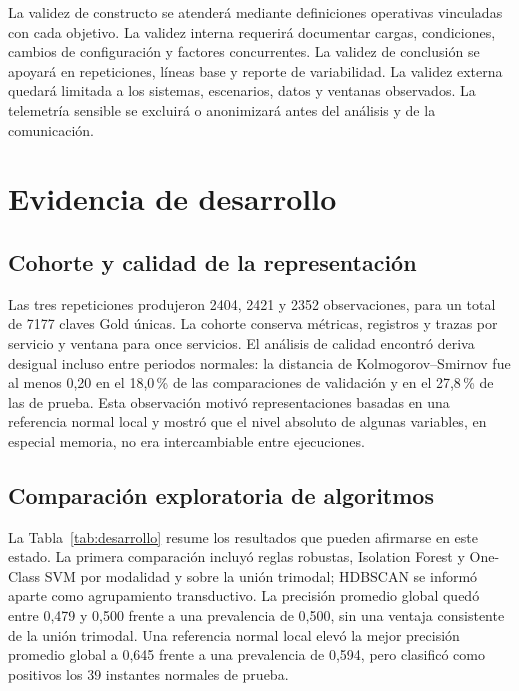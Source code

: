 \documentclass[conference]{IEEEtran}
\begin{document}
La validez de constructo se atenderá mediante definiciones operativas vinculadas con cada objetivo. La validez interna requerirá documentar cargas, condiciones, cambios de configuración y factores concurrentes. La validez de conclusión se apoyará en repeticiones, líneas base y reporte de variabilidad. La validez externa quedará limitada a los sistemas, escenarios, datos y ventanas observados. La telemetría sensible se excluirá o anonimizará antes del análisis y de la comunicación.

\section{Evidencia de desarrollo}

\subsection{Cohorte y calidad de la representación}

Las tres repeticiones produjeron 2404, 2421 y 2352 observaciones, para un total de 7177 claves Gold únicas. La cohorte conserva métricas, registros y trazas por servicio y ventana para once servicios. El análisis de calidad encontró deriva desigual incluso entre periodos normales: la distancia de Kolmogorov--Smirnov fue al menos 0,20 en el 18,0\,\% de las comparaciones de validación y en el 27,8\,\% de las de prueba. Esta observación motivó representaciones basadas en una referencia normal local y mostró que el nivel absoluto de algunas variables, en especial memoria, no era intercambiable entre ejecuciones.

\subsection{Comparación exploratoria de algoritmos}

La Tabla~\ref{tab:desarrollo} resume los resultados que pueden afirmarse en este estado. La primera comparación incluyó reglas robustas, Isolation Forest y One-Class SVM por modalidad y sobre la unión trimodal; HDBSCAN se informó aparte como agrupamiento transductivo. La precisión promedio global quedó entre 0,479 y 0,500 frente a una prevalencia de 0,500, sin una ventaja consistente de la unión trimodal. Una referencia normal local elevó la mejor precisión promedio global a 0,645 frente a una prevalencia de 0,594, pero clasificó como positivos los 39 instantes normales de prueba.
\end{document}
